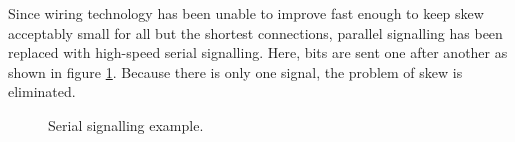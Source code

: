 		Since wiring technology has been unable to improve fast enough to keep
		skew acceptably small for all but the shortest connections, parallel
		signalling has been replaced with high-speed serial signalling.  Here,
		bits are sent one after another as shown in figure
		\ref{fig:serial-example}. Because there is only one signal, the problem of
		skew is eliminated.
		
		\begin{figure}
			\center
			\begin{tikzpicture}
				
			\end{tikzpicture}
			
			\caption{Serial signalling example.}
			\label{fig:serial-example}
		\end{figure}
